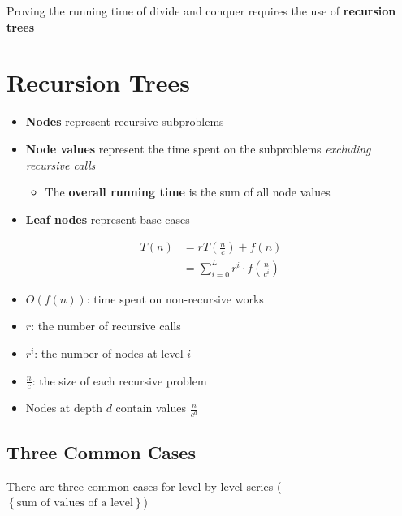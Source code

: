     Proving the running time of divide and conquer requires the use of
    \textbf{recursion trees}

\section{Recursion Trees}

  \begin{itemize}
    \item \textbf{Nodes} represent recursive subproblems
    \item \textbf{Node values} represent the time spent on the subproblems
    \textit{excluding recursive calls}
    \begin{itemize}
      \item The \textbf{overall running time} is the sum of all node values
    \end{itemize}

    \item \textbf{Leaf nodes} represent base cases
  \end{itemize}

  \begin{align}
    T\left( n \right)
    &= r T\left( \frac{n}{c} \right) + f\left( n \right) \\
    &= \sum_{i = 0}^{L} r^{i} \cdot f\left( \frac{n}{c^{i}} \right)
  \end{align}

  \begin{itemize}
    \item $ O\left( f\left( n \right) \right) $: time spent on non-recursive
    works
    \item $ r $: the number of recursive calls
    \item $ r^{i} $: the number of nodes at level $ i $
    \item $ \frac{n}{c} $: the size of each recursive problem
    \item Nodes at depth $ d $ contain values $ \frac{n}{c^{d}} $
  \end{itemize}

  \subsection{Three Common Cases}

    There are three common cases for level-by-level series
    ($ \left\{ \text{sum of values of a level} \right\} $)

